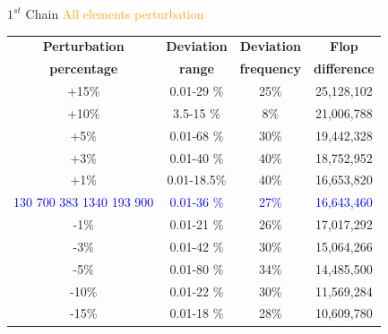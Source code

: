 \documentclass[10pts]{beamer}
\begin{document}
	
	  
	
	
	  
	  \begin{frame}{$1^{st}$ Chain \hspace{30pt} \textcolor{orange}{All elements perturbation} }
	  	\begin{tabular}{c | c |c | c}
	  		\textbf{Perturbation} & \textbf{Deviation} & \textbf{Deviation} & \textbf{Flop }\\
	  		\textbf{percentage}& \textbf{range}&\textbf{frequency}&\textbf{difference}\\
	  		
	  		+15\%	&	 0.01-29 \%		&	25\%		&	25,128,102\\
	  		+10\%	&	 3.5-15 \%		&	8\%			&   21,006,788\\
	  		+5\%	&    0.01-68 \%		&	30\%		&	19,442,328\\
	  		+3\%	&    0.01-40 \%		&	40\%		&	18,752,952\\
	  		+1\%	&    0.01-18.5\%	&	40\%	    &	16,653,820\\
	  		\textcolor{blue}{130} \textcolor{blue}{700} \textcolor{blue}{383} \textcolor{blue}{1340} \textcolor{blue}{193} \textcolor{blue}{900}	&    \textcolor{blue}{0.01-36 \%}		&	\textcolor{blue}{27\%}		&	\textcolor{blue}{16,643,460}\\
	  	   -1\%	&    0.01-21 \%		&	26\%		&	17,017,292\\
	  	   -3\%	&    0.01-42 \%		&	30\%		&	15,064,266\\
	  	   -5\%	&    0.01-80 \%		&	34\%		&	14,485,500\\
	  	   -10\%	& 	 0.01-22 \%		&	30\%		&	11,569,284\\
	  	 	-15\%	&	 0.01-18 \%		&	28\%		&	10,609,780\\
	  		
	  		
	  		
	  		
	  	
	  	\end{tabular}
	  \end{frame}
	  
\end{document}
